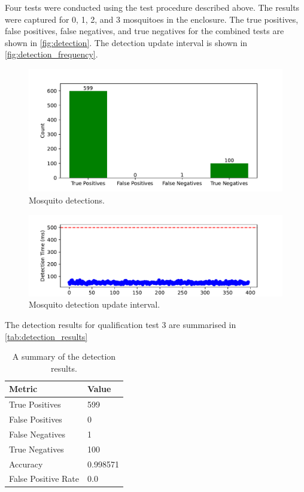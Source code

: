 Four tests were conducted using the test procedure described above. The results were captured for 0, 1, 2, and 3 mosquitoes in the enclosure. The true positives, false positives, false negatives, and true negatives for the combined tests are shown in \autoref{fig:detection}. The detection update interval is shown in \autoref{fig:detection_frequency}.
\begin{figure}[h]
  \centering
  \includegraphics[width=\textwidth]{figures/results/detection.pdf}
  \caption{Mosquito detections.}
  \label{fig:detection}
\end{figure}
\begin{figure}[h]
  \centering
  \includegraphics[width=\textwidth]{figures/results/detection_frequency.pdf}
  \caption{Mosquito detection update interval.}
  \label{fig:detection_frequency}
\end{figure}
The detection results for qualification test 3 are summarised in \autoref{tab:detection_results}
\begin{table}[h]
  \centering
  \begin{tabular}{|l|l|}
    \hline
    \textbf{Metric}     & \textbf{Value} \\
    \hline
    True Positives      & 599            \\
    False Positives     & 0              \\
    False Negatives     & 1              \\
    True Negatives      & 100            \\
    Accuracy            & 0.998571       \\
    False Positive Rate & 0.0            \\
    \hline
  \end{tabular}
  \caption{A summary of the detection results.}
  \label{tab:detection_results}
\end{table}

